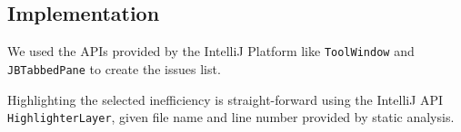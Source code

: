 \vspace{-2mm}
\subsection{Implementation}

We used the APIs provided by the
IntelliJ Platform like {\tt ToolWindow} and
{\tt JBTabbedPane}
to create the \Tool issues list.

Highlighting the selected inefficiency is straight-forward using
the IntelliJ API {\tt HighlighterLayer}, given file name and line number provided by \Tool static analysis.

